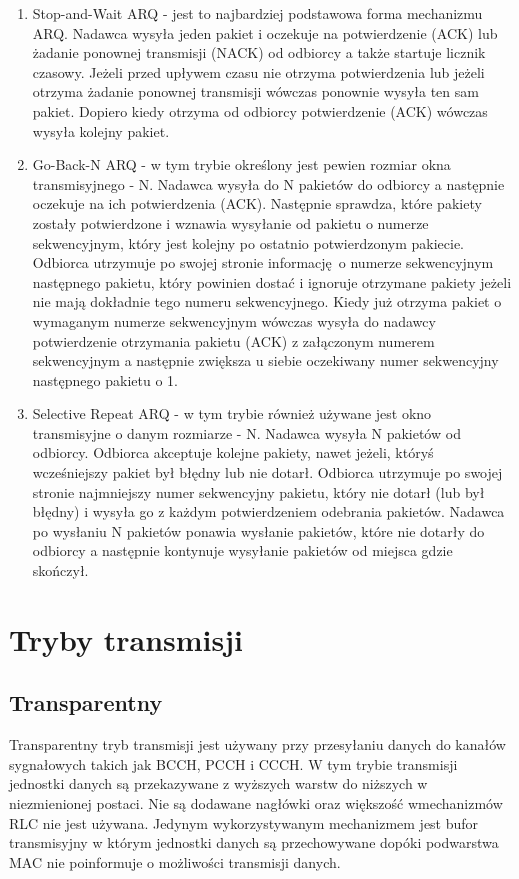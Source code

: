 \begin{enumerate}
	\item Stop-and-Wait ARQ - jest to najbardziej podstawowa forma mechanizmu ARQ. Nadawca wysyła jeden pakiet i oczekuje na potwierdzenie (ACK) lub żadanie ponownej transmisji (NACK) od odbiorcy a także startuje licznik czasowy. Jeżeli przed upływem czasu nie otrzyma potwierdzenia lub jeżeli otrzyma żadanie ponownej transmisji wówczas ponownie wysyła ten sam pakiet. Dopiero kiedy otrzyma od odbiorcy potwierdzenie (ACK) wówczas wysyła kolejny pakiet.
	\item Go-Back-N ARQ - w tym trybie określony jest pewien rozmiar okna transmisyjnego - N. Nadawca wysyła do N pakietów do odbiorcy a następnie oczekuje na ich potwierdzenia (ACK). Następnie sprawdza, które pakiety zostały potwierdzone i wznawia wysyłanie od pakietu o numerze sekwencyjnym, który jest kolejny po ostatnio potwierdzonym pakiecie. Odbiorca utrzymuje po swojej stronie informację o numerze sekwencyjnym następnego pakietu, który powinien dostać i ignoruje otrzymane pakiety jeżeli nie mają dokładnie tego numeru sekwencyjnego. Kiedy już otrzyma pakiet o wymaganym numerze sekwencyjnym wówczas wysyła do nadawcy potwierdzenie otrzymania pakietu (ACK) z załączonym numerem sekwencyjnym a następnie zwiększa u siebie oczekiwany numer sekwencyjny następnego pakietu o 1.
	\item Selective Repeat ARQ - w tym trybie również używane jest okno transmisyjne o danym rozmiarze - N. Nadawca wysyła N pakietów od odbiorcy. Odbiorca akceptuje kolejne pakiety, nawet jeżeli, któryś wcześniejszy pakiet był błędny lub nie dotarł. Odbiorca utrzymuje po swojej stronie najmniejszy numer sekwencyjny pakietu, który nie dotarł (lub był błędny) i wysyła go z każdym potwierdzeniem odebrania pakietów. Nadawca po wysłaniu N pakietów ponawia wysłanie pakietów, które nie dotarły do odbiorcy a następnie kontynuje wysyłanie pakietów od miejsca gdzie skończył.
\end{enumerate}

\section{Tryby transmisji}

\subsection{Transparentny}

Transparentny tryb transmisji jest używany przy przesyłaniu danych do kanałów sygnałowych takich jak BCCH, PCCH i CCCH. W tym trybie transmisji jednostki danych są przekazywane z wyższych warstw do niższych w niezmienionej postaci. Nie są dodawane nagłówki oraz większość wmechanizmów RLC nie jest używana. Jedynym wykorzystywanym mechanizmem jest bufor transmisyjny w którym jednostki danych są przechowywane dopóki podwarstwa MAC nie poinformuje o możliwości transmisji danych.

